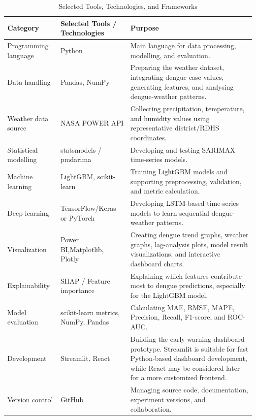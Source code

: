 \documentclass[12pt,a4paper]{article}
\begin{document}
\begin{table}[htbp]
\centering
\caption{Selected Tools, Technologies, and Frameworks}
\label{tab:tools_technologies}
\small
\begin{tabularx}{\textwidth}{>{\raggedright\arraybackslash}p{3.4cm} >{\raggedright\arraybackslash}p{4.2cm} >{\raggedright\arraybackslash}X}
\toprule
\textbf{Category} & \textbf{Selected Tools / Technologies} & \textbf{Purpose} \\
\midrule
Programming language & Python & Main language for data processing, modelling, and evaluation. \\

Data handling & Pandas, NumPy & Preparing the weather dataset, integrating dengue case values, generating features, and analysing dengue-weather patterns. \\

Weather data source & NASA POWER API & Collecting precipitation, temperature, and humidity values using representative district/RDHS coordinates. \\

Statistical modelling & statsmodels / pmdarima & Developing and testing SARIMAX time-series models. \\

Machine learning & LightGBM, scikit-learn & Training LightGBM models and supporting preprocessing, validation, and metric calculation. \\

Deep learning & TensorFlow/Keras or PyTorch & Developing LSTM-based time-series models to learn sequential dengue-weather patterns. \\

Visualization & Power BI,Matplotlib, Plotly & Creating dengue trend graphs, weather graphs, lag-analysis plots, model result visualizations, and interactive dashboard charts. \\

Explainability & SHAP / Feature importance & Explaining which features contribute most to dengue predictions, especially for the LightGBM model. \\

Model evaluation & scikit-learn metrics, NumPy, Pandas & Calculating MAE, RMSE, MAPE, Precision, Recall, F1-score, and ROC-AUC. \\

Development & Streamlit, React & Building the early warning dashboard prototype. Streamlit is suitable for fast Python-based dashboard development, while React may be considered later for a more customized frontend. \\

Version control & GitHub & Managing source code, documentation, experiment versions, and collaboration. \\
\bottomrule
\end{tabularx}
\end{table}
\end{document}
